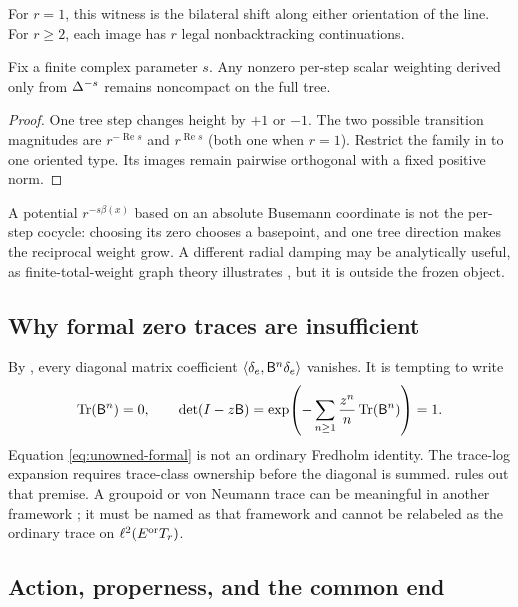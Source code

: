 For $r=1$, this witness is the bilateral shift along either orientation of
the line.  For $r\ge2$, each image has $r$ legal nonbacktracking
continuations.

\begin{corollary}
\label{cor:modular-noncompact}
Fix a finite complex parameter $s$.  Any nonzero per-step scalar weighting
derived only from $\Delta^{-s}$ remains noncompact on the full tree.
\end{corollary}

\begin{proof}
One tree step changes height by $+1$ or $-1$.  The two possible transition
magnitudes are $r^{-\operatorname{Re}s}$ and
$r^{\operatorname{Re}s}$ (both one when $r=1$).  Restrict the family in
 to one oriented type.  Its images remain pairwise
orthogonal with a fixed positive norm.
\end{proof}

A potential $r^{-s\beta(x)}$ based on an absolute Busemann coordinate is not
the per-step cocycle: choosing its zero chooses a basepoint, and one tree
direction makes the reciprocal weight grow.  A different radial damping may
be analytically useful, as finite-total-weight graph theory illustrates
\citep{deitmar2015ihara}, but it is outside the frozen object.

\subsection{Why formal zero traces are insufficient}

By , every diagonal matrix coefficient
$\langle\delta_e,\mathsf{B}^n\delta_e\rangle$ vanishes.  It is tempting to write
\[
  \operatorname{Tr}(\mathsf{B}^n)=0,
  \qquad
  \det(I-z\mathsf{B})=
  \exp\!\left(-\sum_{n\ge1}\frac{z^n}{n}\operatorname{Tr}(\mathsf{B}^n)\right)=1.
  \label{eq:unowned-formal}
\]
Equation \eqref{eq:unowned-formal} is not an ordinary Fredholm identity.
The trace-log expansion requires trace-class ownership before the diagonal is
summed.   rules out that premise.  A groupoid or
von Neumann trace can be meaningful in another framework
\citep{clair2001zeta,lenz2019ihara}; it must be named as that framework and
cannot be relabeled as the ordinary trace on $\ell^2(E^{\mathrm{or}}T_r)$.

\subsection{Action, properness, and the common end}

